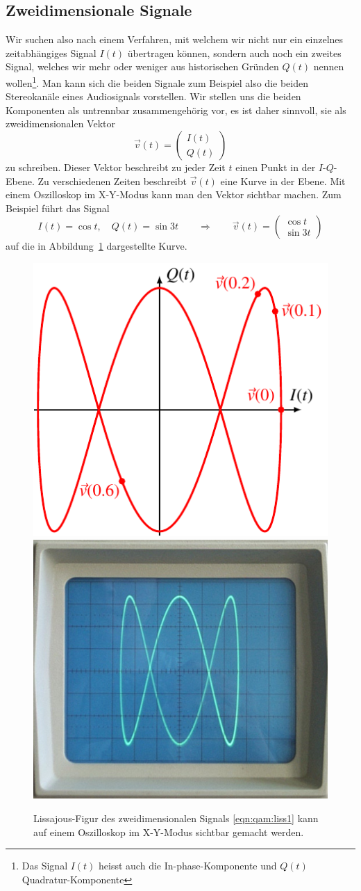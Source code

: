 %
%
%
\subsection{Zweidimensionale Signale
\label{subsection:qam:zweidimensional}}
Wir suchen also nach einem Verfahren, mit welchem wir nicht nur
ein einzelnes zeitabhängiges Signal $I(t)$ übertragen können, sondern
auch noch ein zweites Signal, welches wir mehr oder weniger aus
historischen Gründen $Q(t)$ nennen wollen\footnote{Das Signal $I(t)$
heisst auch die In-phase-Komponente und $Q(t)$ Quadratur-Komponente}.
Man kann sich die beiden Signale zum Beispiel also die beiden
Stereokanäle eines Audiosignals vorstellen.
Wir stellen uns die beiden Komponenten als untrennbar zusammengehörig
vor, es ist daher sinnvoll, sie als zweidimensionalen Vektor
\[
\vec{v}(t)
=
\begin{pmatrix}I(t)\\Q(t)\end{pmatrix}
\]
zu schreiben.
Dieser Vektor beschreibt zu jeder Zeit $t$ einen Punkt in der
$I$-$Q$-Ebene.
Zu verschiedenen Zeiten beschreibt $\vec{v}(t)$ eine Kurve
in der Ebene.
Mit einem Oszilloskop im X-Y-Modus kann man den Vektor
sichtbar machen.
Zum Beispiel führt das Signal
\begin{equation}
I(t) = \cos t,\quad
Q(t) = \sin 3t
\qquad
\Rightarrow
\qquad
\vec{v}(t)
=
\begin{pmatrix}
\cos t\\
\sin 3t
\end{pmatrix}
\label{eqn:qam:liss1}
\end{equation}
auf die in Abbildung~\ref{figure:qam:lissajous} dargestellte Kurve.
\begin{figure}
\centering
\includegraphics[width=0.48\hsize]{applications/qam/lissajous.pdf}
\includegraphics[width=0.48\hsize]{applications/qam/lissajous.jpg}
\caption{Lissajous-Figur des zweidimensionalen Signals
\eqref{eqn:qam:liss1} kann auf einem Oszilloskop im X-Y-Modus
sichtbar gemacht werden.
\label{figure:qam:lissajous}}
\end{figure}
